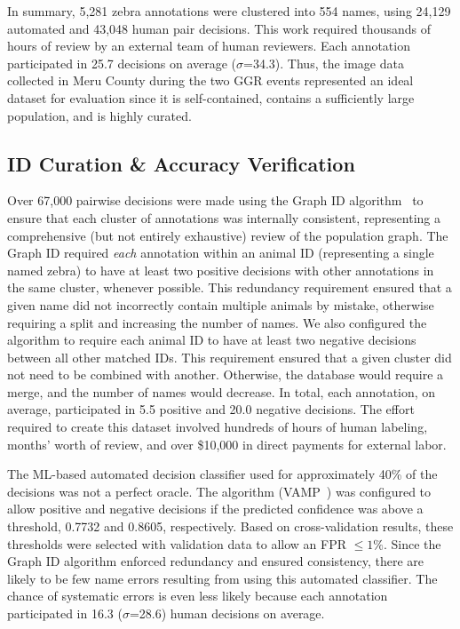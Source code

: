 In summary, 5,281 zebra annotations were clustered into 554 names, using 24,129 automated and 43,048 human pair decisions.  This work required thousands of hours of review by an external team of human reviewers.  Each annotation participated in 25.7 decisions on average ($\sigma$=34.3). Thus, the image data collected in Meru County during the two GGR events represented an ideal dataset for evaluation since it is self-contained, contains a sufficiently large population, and is highly curated.

\subsection{ID Curation \& Accuracy Verification}

Over 67,000 pairwise decisions were made using the Graph ID algorithm~\cite{crall_identifying_2017} to ensure that each cluster of annotations was internally consistent, representing a comprehensive (but not entirely exhaustive) review of the population graph.  The Graph ID required \textit{each} annotation within an animal ID (representing a single named zebra) to have at least two positive decisions with other annotations in the same cluster, whenever possible.  This redundancy requirement ensured that a given name did not incorrectly contain multiple animals by mistake, otherwise requiring a split and increasing the number of names.  We also configured the algorithm to require each animal ID to have at least two negative decisions between all other matched IDs.  This requirement ensured that a given cluster did not need to be combined with another.  Otherwise, the database would require a merge, and the number of names would decrease.  In total, each annotation, on average, participated in 5.5 positive and 20.0 negative decisions.  The effort required to create this dataset involved hundreds of hours of human labeling, months’ worth of review, and over \$10,000 in direct payments for external labor.

The ML-based automated decision classifier used for approximately 40\% of the decisions was not a perfect oracle.  The algorithm (VAMP~\cite{crall_identifying_2017}) was configured to allow positive and negative decisions if the predicted confidence was above a threshold, 0.7732 and 0.8605, respectively.  Based on cross-validation results, these thresholds were selected with validation data to allow an FPR $\leq 1\%$.  Since the Graph ID algorithm enforced redundancy and ensured consistency, there are likely to be few name errors resulting from using this automated classifier.  The chance of systematic errors is even less likely because each annotation participated in 16.3 ($\sigma$=28.6) human decisions on average.

